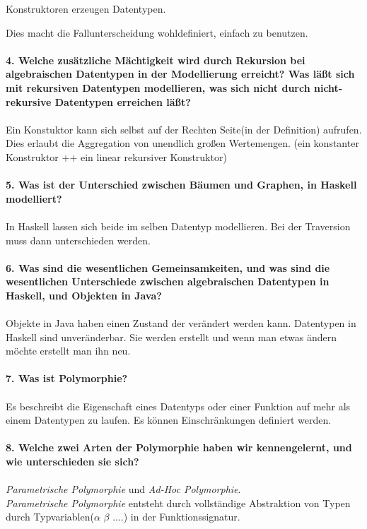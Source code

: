 \documentclass{article}
\begin{document}
Konstruktoren erzeugen Datentypen.

Dies macht die Fallunterscheidung wohldefiniert, einfach zu benutzen.
\\
\\
\textbf{4. Welche zusätzliche Mächtigkeit wird durch Rekursion bei algebraischen Datentypen in der Modellierung erreicht? Was läßt sich mit rekursiven Datentypen modellieren, was sich nicht durch nicht-rekursive Datentypen erreichen läßt?}
\\
\\
Ein Konstuktor kann sich selbst auf der Rechten Seite(in der Definition) aufrufen.
Dies erlaubt die Aggregation von unendlich gro\ss en Wertemengen.
 (ein konstanter Konstruktor ++ ein linear rekursiver Konstruktor)
\\
\\
\textbf{5. Was ist der Unterschied zwischen Bäumen und Graphen, in Haskell modelliert?}
\\
\\
In Haskell lassen sich beide im selben Datentyp modellieren. Bei der Traversion muss dann unterschieden werden.
\\
\\
\textbf{6. Was sind die wesentlichen Gemeinsamkeiten, und was sind die wesentlichen Unterschiede zwischen algebraischen Datentypen in Haskell, und Objekten in Java?}
\\
\\
Objekte in Java haben einen Zustand der ver\"andert werden kann. Datentypen in Haskell sind unver\"anderbar. Sie werden erstellt und wenn man etwas \"andern m\"ochte erstellt man ihn neu.
\\
\\
\textbf{7. Was ist Polymorphie?}
\\
\\
Es beschreibt die Eigenschaft eines Datentyps oder einer Funktion auf mehr als einem Datentypen zu laufen. Es k\"onnen Einschr\"ankungen definiert werden.
\\
\\
\textbf{8. Welche zwei Arten der Polymorphie haben wir kennengelernt, und wie unterschieden sie sich?}
\\
\\
 \emph{Parametrische Polymorphie} und \emph{Ad-Hoc Polymorphie}. 
\\
\emph{Parametrische Polymorphie} entsteht durch vollständige Abstraktion von Typen durch Typvariablen($\alpha$ $\beta$ ....) in der Funktionssignatur.
\end{document}
